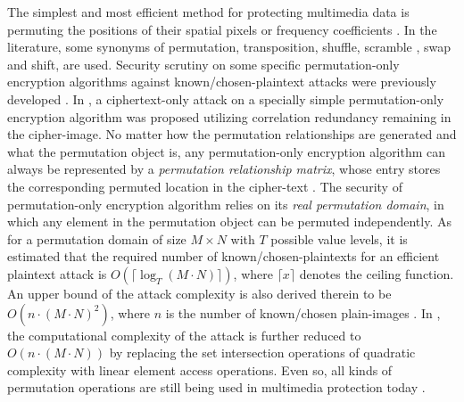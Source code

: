\documentclass[final,3p,times,twocolumn]{elsarticle}
\begin{document}
The simplest and most efficient method for protecting multimedia data is permuting the positions of their spatial pixels \cite{Matias&Shamir:CurveImageEncryption:Crypto87} or frequency coefficients \cite{Zeng:VideoScrambling:IEEETMM2003}. In the literature, some synonyms of permutation, transposition, shuffle, scramble \cite{Zeng:VideoScrambling:IEEETMM2003}, swap and shift,
are used. Security scrutiny on some specific permutation-only encryption algorithms against known/chosen-plaintext attacks were previously developed \cite{Jan-Tseng:BreakingSCAN:IPL96,Chang-Yu:BreakingSCAN:PRL2002}. In \cite{WHLi:shuffle:ACMM2012}, a ciphertext-only attack on
a specially simple permutation-only encryption algorithm was proposed utilizing correlation redundancy remaining in the cipher-image. No matter how the permutation relationships are generated and what the permutation object is,
any permutation-only encryption algorithm can always be represented by a \textit{permutation relationship matrix}, whose entry
stores the corresponding permuted location in the cipher-text \cite{Li:Permutation:SPIC2008}. The security of permutation-only encryption algorithm
relies on its \textit{real permutation domain}, in which any element in the permutation object can be permuted independently. As for a permutation domain of size $M\times N$ with $T$ possible value levels, it is estimated that the required number of known/chosen-plaintexts for an efficient plaintext attack is $O(\lceil\log_T(M\cdot N)\rceil)$, where $\lceil x\rceil$ denotes the ceiling function. An upper bound of the attack complexity is also derived therein to be
$O(n\cdot (M\cdot N)^2)$, where $n$ is the number of known/chosen plain-images \cite{Li:Permutation:SPIC2008}. In \cite{Lcq:Optimal:SP11}, the computational complexity of the attack is
further reduced to $O(n\cdot (M\cdot N))$ by replacing the set intersection operations of quadratic complexity with linear element access operations.
Even so, all kinds of permutation operations are still being used in multimedia protection today \cite{Li:scramble:ITCSVT2008,Sohn:scrambling:TCSVT2011,Zhouyc:perturbation:SP14,SMYU:ARM:IJBC2014}.
\end{document}
